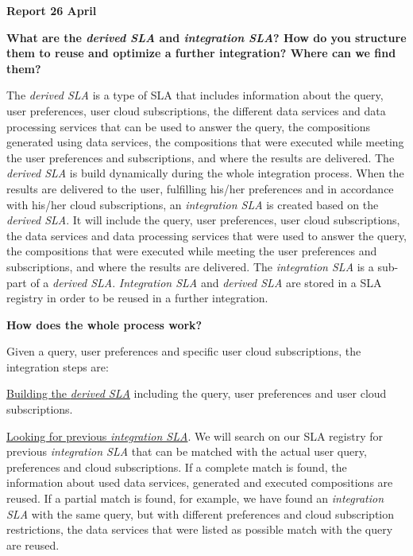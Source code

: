 \documentclass[10pt,a4paper,final]{report}
\begin{document}
\begin{center}
\textbf{Report 26 April}
\end{center}

\noindent \textbf{What are the \textsl{derived SLA} and \textsl{integration SLA}? How do you structure them to reuse and optimize a further integration? Where can we find them?}

The \textsl{derived SLA} is a type of SLA that includes information about the query, user preferences, user cloud subscriptions, the different data services and data processing services that can be used to answer the query, the compositions generated using data services, the compositions that were executed while meeting the user preferences and subscriptions, and where the results are delivered. The \textsl{derived SLA} is build dynamically during the whole integration process. When the results are delivered to the user, fulfilling his/her preferences and in accordance with his/her cloud subscriptions, an \textsl{integration SLA} is created based on the \textsl{derived SLA}. It will include the query, user preferences, user cloud subscriptions, the data services and data processing services that were used to answer the query, the compositions that were executed while meeting the user preferences and subscriptions, and where the results are delivered. The \textsl{integration SLA} is a sub-part of a \textsl{derived SLA}. \textsl{Integration SLA} and \textsl{derived SLA} are stored in a SLA registry in order to be reused in a further integration.
\bigskip

\noindent \textbf{How does the whole process work?}

Given a query, user preferences and specific user cloud subscriptions, the integration steps are:

\noindent \underline{Building the \textsl{derived SLA}} including the query, user preferences and user cloud subscriptions.

\noindent \underline{Looking for previous \textsl{integration SLA}}. We will search on our SLA registry for previous \textsl{integration SLA} that can be matched with the actual user query, preferences and cloud subscriptions. If a complete match is found, the information about used data services, generated and executed compositions are reused. If a partial match is found, for example, we have found an \textsl{integration SLA} with the same query, but with different preferences and cloud subscription restrictions, the data services that were listed as possible match with the query are reused.
\end{document}

